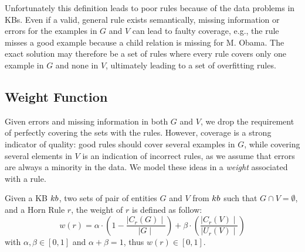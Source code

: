 Unfortunately
this definition leads to poor rules because of the data problems in KBs. Even if a valid, general rule exists semantically, missing information or errors for the examples in $G$ and $V$ can lead to faulty coverage, e.g., the rule misses a good example because a child relation is missing for M. Obama. %
The exact solution may therefore be a set of rules where every rule covers only one example in $G$ and none in $V$, ultimately leading to a set of overfitting rules.

\subsection{Weight Function} \label{sec:krd_weight_fun}
Given errors and missing information in both $G$ and $V$, we drop the requirement of perfectly covering the sets with the rules. However, coverage is a strong indicator of quality: good rules should cover several examples in $G$, while covering several elements in $V$ is an indication of incorrect rules, as we assume that errors are always a minority in the data. 
We model these ideas in a \emph{weight} associated with a rule. %


\begin{definition}
	Given a KB ${\sc kb}$, two sets of pair of entities $G$ and $V$ from ${\sc kb}$ such that $G \cap V = \emptyset$, and a Horn Rule $r$, the weight of $r$ is defined as follow:
	\begin{equation} \label{eq:weight_fun}
		w(r) = \alpha \cdot (1-\frac{\mid C_{r}(G)\mid}{\mid G \mid}) +\beta \cdot (\frac{\mid C_{r}(V) \mid}{\mid U_{r}(V)\mid})
	\end{equation}
	with $\alpha,\beta \in [0,1]$ and $\alpha + \beta = 1$, thus $w(r) \in [0,1]$. 
\end{definition}

